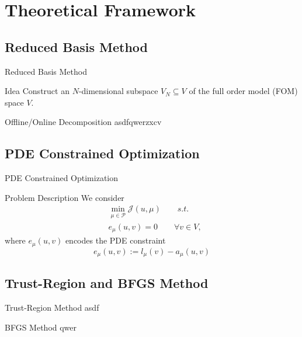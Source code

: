 \section{Theoretical Framework}

\subsection{Reduced Basis Method}

\begin{frame}{Reduced Basis Method}
    \begin{block}{Idea}
        Construct an $N$-dimensional subspace $V_N \subseteq V$ of the full order model (FOM) space $V$.
    \end{block}

\end{frame}

\begin{frame}{Offline/Online Decomposition}
    asdfqwerzxcv
\end{frame}

\subsection{PDE Constrained Optimization}

\begin{frame}{PDE Constrained Optimization}
    \begin{block}{Problem Description}
        We consider
        \begin{align*}
            &\min\limits_{\mu \in \mathcal{P}} \mathcal{J}(u, \mu) \qquad s.t.\\
            &e_\mu(u, v) = 0 \qquad \forall v \in V,
        \end{align*}
        where $e_\mu(u, v)$ encodes the PDE constraint
        \begin{equation*}
            e_\mu(u, v) := l_\mu(v) - a_\mu(u, v)
        \end{equation*}
    \end{block}
\end{frame}

\subsection{Trust-Region and BFGS Method}

\begin{frame}{Trust-Region Method}
    asdf
\end{frame}

\begin{frame}{BFGS Method}
    qwer
\end{frame}